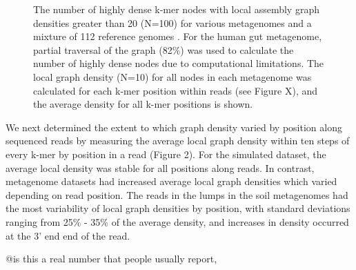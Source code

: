 \documentclass[11pt]{article} %
\begin{document}
\begin{figure}
\caption{The number of highly dense k-mer nodes with local assembly graph densities greater than 20 (N=100) for various metagenomes and a mixture of 112 reference genomes \cite{Pignatelli:2011p742}. For the human gut metagenome, partial traversal of the graph (82\%) was used to calculate the number of highly dense nodes due to computational limitations.  The local graph density (N=10) for all nodes in each metagenome was calculated for each k-mer position within reads (see Figure X), and the average density for all k-mer positions is shown.}  
\end{figure}

We next determined the extent to which graph density varied by position along sequenced reads by measuring the average local graph density within ten steps of every k-mer by position in a read (Figure 2).  For the simulated dataset, the average local density was stable for all positions along reads.  In contrast, metagenome datasets had increased average local graph densities which varied depending on read position.  The reads in the lumps in the soil metagenomes had the most variability of local graph densities by position, with standard deviations ranging from 25\% - 35\% of the average density, and increases in density occurred at the 3' end end of the read.

@is this a real number that people usually report, %
\end{document}
